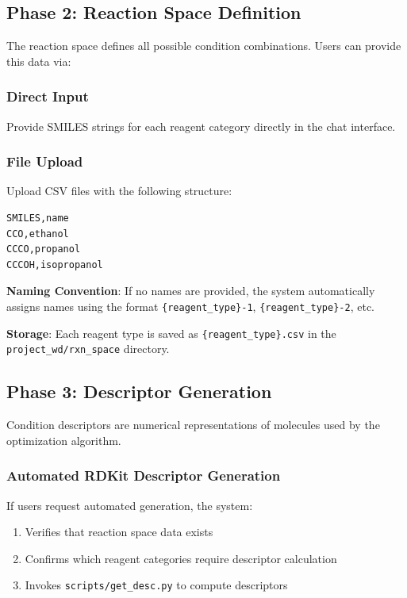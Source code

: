 \documentclass[12pt,a4paper]{article}
\begin{document}
\subsection{Phase 2: Reaction Space Definition}

The reaction space defines all possible condition combinations. Users can provide this data via:

\subsubsection{Direct Input}

Provide SMILES strings for each reagent category directly in the chat interface.

\subsubsection{File Upload}

Upload CSV files with the following structure:

\begin{lstlisting}[language=csv]
SMILES,name
CCO,ethanol
CCCO,propanol
CCCOH,isopropanol
\end{lstlisting}

\textbf{Naming Convention}: If no names are provided, the system automatically assigns names using the format \texttt{\{reagent\_type\}-1}, \texttt{\{reagent\_type\}-2}, etc.

\textbf{Storage}: Each reagent type is saved as \texttt{\{reagent\_type\}.csv} in the \texttt{project\_wd/rxn\_space} directory.

\subsection{Phase 3: Descriptor Generation}

Condition descriptors are numerical representations of molecules used by the optimization algorithm.

\subsubsection{Automated RDKit Descriptor Generation}

If users request automated generation, the system:

\begin{enumerate}
    \item Verifies that reaction space data exists
    \item Confirms which reagent categories require descriptor calculation
    \item Invokes \texttt{scripts/get\_desc.py} to compute descriptors
\end{enumerate}
\end{document}
